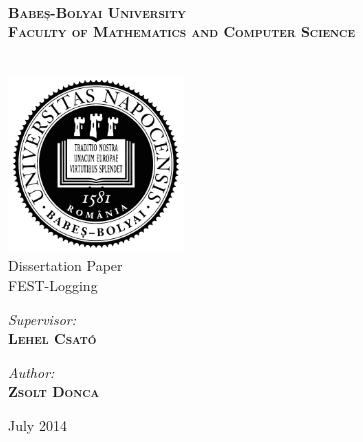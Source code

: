 \begin{titlepage}


{
    \Large \bfseries
    \textsc
    {
        \\
        Babeș-Bolyai University \\
        Faculty of Mathematics and Computer Science \\
    }
}
\\[2.5cm]


\begin{center}

\includegraphics[width=0.35\textwidth]{./images/logo_ubb}
\\[1.5cm]

{\sc \large Dissertation Paper}
\\[1.5cm]

{\sc \Huge FEST-Logging}
\\[6.0cm]

\begin{minipage}{0.4\textwidth}
\begin{flushleft} \Large
\emph{\sc Supervisor:}\\
\textsc{\textbf{Lehel Csató}}
\end{flushleft}
\end{minipage}
\begin{minipage}{0.4\textwidth}
\begin{flushright} \Large
\emph{\sc Author:} \\
\textsc{\textbf{Zsolt Donca}}
\end{flushright}
\end{minipage}

\vfill

{\large \sc July 2014}

\end{center}

\end{titlepage}
